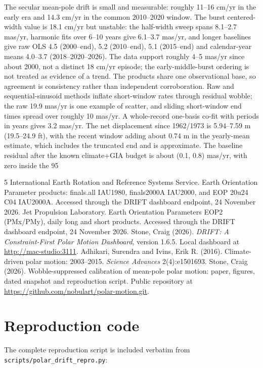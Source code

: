 \documentclass[11pt,a4paper]{article}
\begin{document}
The secular mean-pole drift is small and measurable: roughly 11--16 cm/yr in the early era and 14.3 cm/yr in the common 2010--2020 window. The burst centered-width value is 18.1 cm/yr but unstable: the half-width sweep spans 8.1--2.7 mas/yr, harmonic fits over 6--10 years give 6.1--3.7 mas/yr, and longer baselines give raw OLS 4.5 (2000--end), 5.2 (2010--end), 5.1 (2015--end) and calendar-year means 4.0--3.7 (2018--2020--2026). The data support roughly 4--5 mas/yr since about 2000, not a distinct 18 cm/yr episode; the early-middle-burst ordering is not treated as evidence of a trend. The products share one observational base, so agreement is consistency rather than independent corroboration. Raw and sequential-sinusoid methods inflate short-window rates through residual wobble; the raw 19.9 mas/yr is one example of scatter, and sliding short-window end times spread over roughly 10 mas/yr. A whole-record one-basis co-fit with periods in years gives 3.2 mas/yr. The net displacement since 1962/1973 is 5.94--7.59 m (19.5--24.9 ft), with the recent window adding about 0.74 m in the yearly-mean estimate, which includes the truncated end and is approximate. The baseline residual after the known climate+GIA budget is about (0.1, 0.8) mas/yr, with zero inside the 95%

\begin{thebibliography}{5}
 International Earth Rotation and Reference Systems Service. Earth Orientation Parameter products: finals.all IAU1980, finals2000A IAU2000, and EOP 20u24 C04 IAU2000A. Accessed through the DRIFT dashboard endpoint, 24 November 2026.
 Jet Propulsion Laboratory. Earth Orientation Parameters EOP2 (PMx/PMy), daily long and short products. Accessed through the DRIFT dashboard endpoint, 24 November 2026.
 Stone, Craig (2026). \emph{DRIFT: A Constraint-First Polar Motion Dashboard}, version 1.6.5. Local dashboard at \url{http://mac-studio:3111}.
 Adhikari, Surendra and Ivins, Erik R. (2016). Climate-driven polar motion: 2003--2015. \emph{Science Advances} 2(4):e1501693.
 Stone, Craig (2026). Wobble-suppressed calibration of mean-pole polar motion: paper, figures, dated snapshot and reproduction script. Public repository at \url{https://github.com/nobulart/polar-motion.git}.
\end{thebibliography}

\appendix
\section{Reproduction code}

The complete reproduction script is included verbatim from \texttt{scripts/polar\_drift\_repro.py}:


\end{document}
